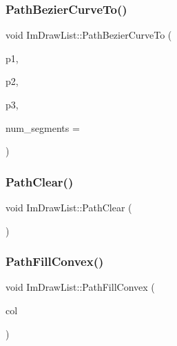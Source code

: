 \hypertarget{struct_im_draw_list_a495ca7dd4fd5a898e2414658321f4b18}{}\label{struct_im_draw_list_a495ca7dd4fd5a898e2414658321f4b18} 
\subsubsection{\texorpdfstring{Path\+Bezier\+Curve\+To()}{PathBezierCurveTo()}}
{\footnotesize\ttfamily void Im\+Draw\+List\+::\+Path\+Bezier\+Curve\+To (\begin{DoxyParamCaption}\item[{const \hyperlink{struct_im_vec2}{Im\+Vec2} \&}]{p1,  }\item[{const \hyperlink{struct_im_vec2}{Im\+Vec2} \&}]{p2,  }\item[{const \hyperlink{struct_im_vec2}{Im\+Vec2} \&}]{p3,  }\item[{int}]{num\+\_\+segments = {} }\end{DoxyParamCaption})}

\hypertarget{struct_im_draw_list_ae9ad5f4d638b1bfd9383618dc60e3f18}{}\label{struct_im_draw_list_ae9ad5f4d638b1bfd9383618dc60e3f18} 
\subsubsection{\texorpdfstring{Path\+Clear()}{PathClear()}}
{\footnotesize\ttfamily void Im\+Draw\+List\+::\+Path\+Clear (\begin{DoxyParamCaption}{ }\end{DoxyParamCaption})}

\hypertarget{struct_im_draw_list_aea9301cb99ebf4b27f5d3959017567c9}{}\label{struct_im_draw_list_aea9301cb99ebf4b27f5d3959017567c9} 
\subsubsection{\texorpdfstring{Path\+Fill\+Convex()}{PathFillConvex()}}
{\footnotesize\ttfamily void Im\+Draw\+List\+::\+Path\+Fill\+Convex (\begin{DoxyParamCaption}\item[{Im\+U32}]{col }\end{DoxyParamCaption})}

